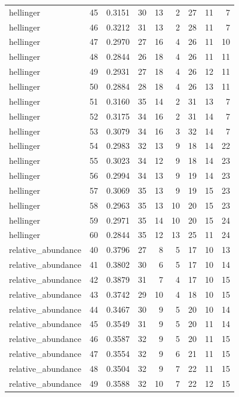 {\begin{longtable}{lrrrrrrrr}
  hellinger & 45 & 0.3151 & 30 & 13 & 2 & 27 & 11 & 7 \\
  hellinger & 46 & 0.3212 & 31 & 13 & 2 & 28 & 11 & 7 \\
  hellinger & 47 & 0.2970 & 27 & 16 & 4 & 26 & 11 & 10 \\
  hellinger & 48 & 0.2844 & 26 & 18 & 4 & 26 & 11 & 11 \\
  hellinger & 49 & 0.2931 & 27 & 18 & 4 & 26 & 12 & 11 \\
  hellinger & 50 & 0.2884 & 28 & 18 & 4 & 26 & 13 & 11 \\
  hellinger & 51 & 0.3160 & 35 & 14 & 2 & 31 & 13 & 7 \\
  hellinger & 52 & 0.3175 & 34 & 16 & 2 & 31 & 14 & 7 \\
  hellinger & 53 & 0.3079 & 34 & 16 & 3 & 32 & 14 & 7 \\
  hellinger & 54 & 0.2983 & 32 & 13 & 9 & 18 & 14 & 22 \\
  hellinger & 55 & 0.3023 & 34 & 12 & 9 & 18 & 14 & 23 \\
  hellinger & 56 & 0.2994 & 34 & 13 & 9 & 19 & 14 & 23 \\
  hellinger & 57 & 0.3069 & 35 & 13 & 9 & 19 & 15 & 23 \\
  hellinger & 58 & 0.2963 & 35 & 13 & 10 & 20 & 15 & 23 \\
  hellinger & 59 & 0.2971 & 35 & 14 & 10 & 20 & 15 & 24 \\
  hellinger & 60 & 0.2844 & 35 & 12 & 13 & 25 & 11 & 24 \\
  relative\_abundance & 40 & 0.3796 & 27 & 8 & 5 & 17 & 10 & 13 \\
  relative\_abundance & 41 & 0.3802 & 30 & 6 & 5 & 17 & 10 & 14 \\
  relative\_abundance & 42 & 0.3879 & 31 & 7 & 4 & 17 & 10 & 15 \\
  relative\_abundance & 43 & 0.3742 & 29 & 10 & 4 & 18 & 10 & 15 \\
  relative\_abundance & 44 & 0.3467 & 30 & 9 & 5 & 20 & 10 & 14 \\
  relative\_abundance & 45 & 0.3549 & 31 & 9 & 5 & 20 & 11 & 14 \\
  relative\_abundance & 46 & 0.3587 & 32 & 9 & 5 & 20 & 11 & 15 \\
  relative\_abundance & 47 & 0.3554 & 32 & 9 & 6 & 21 & 11 & 15 \\
  relative\_abundance & 48 & 0.3504 & 32 & 9 & 7 & 22 & 11 & 15 \\
  relative\_abundance & 49 & 0.3588 & 32 & 10 & 7 & 22 & 12 & 15 \\

\end{longtable}}
